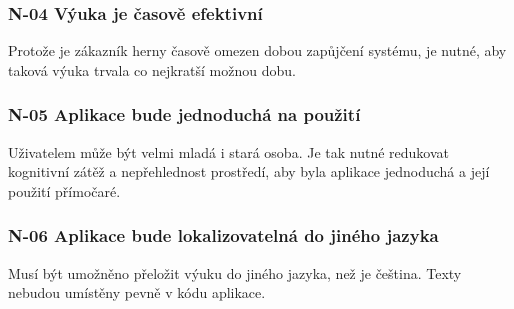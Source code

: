 \subsubsection*{N-04 Výuka je časově efektivní}
Protože je zákazník herny časově omezen dobou zapůjčení systému, je
nutné, aby taková výuka trvala co nejkratší možnou dobu.

\subsubsection*{N-05 Aplikace bude jednoduchá na použití}
Uživatelem může být
velmi mladá i stará osoba. Je tak nutné redukovat kognitivní zátěž a
nepřehlednost prostředí, aby byla aplikace jednoduchá a její použití
přímočaré.

\subsubsection*{N-06 Aplikace bude lokalizovatelná do jiného jazyka}
Musí být
umožněno přeložit výuku do jiného jazyka, než je čeština. Texty nebudou
umístěny pevně v kódu aplikace.
